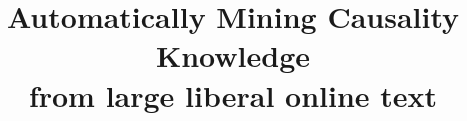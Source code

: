 \documentclass[conference]{IEEEtran}
\begin{document}

\title{Automatically Mining Causality Knowledge\\ from large liberal online text}


\end{document}
